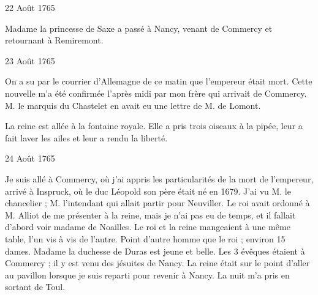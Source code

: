                      \begin{diary}{22 Août 1765}{}


                           Madame la princesse de Saxe a passé à
                           Nancy, venant de Commercy et retournant
                           à Remiremont. \bigskip


                     \end{diary}
                     \begin{diary}{23 Août 1765}{}

                         On a su par le courrier d'Allemagne de
                           ce matin que l'empereur était mort. Cette
                           nouvelle m'a été confirmée l'après midi
                           par mon frère qui
                           arrivait de Commercy.
                           M. le marquis du Chastelet en avait eu une
                           lettre de M. de Lomont. \bigskip



                           La reine est allée à
                              la fontaine royale. Elle
                           a pris trois oiseaux à la pipée, leur a fait
                           laver les ailes et leur a rendu la liberté. \bigskip


                     \end{diary}

                     \begin{diary}{24 Août 1765}{}

                         Je suis allé à Commercy, où j'ai appris les
                           particularités de la mort de l'empereur, arrivé
                           à Inspruck, où le duc Léopold son père était
                           né
                           en 1679. J'ai vu M. le chancelier ; M.
                              l'intendant qui allait partir pour Neuviller.
                           Le roi avait ordonné à
                              M. Alliot de me présenter
                           à la reine, mais je
                           n'ai pas eu de temps, et
                           il fallait d'abord voir madame de Noailles. Le roi et
                           la reine mangeaient à
                           une même table, l'un
                           vis à vis de l'autre. Point d'autre homme que
                           le roi ; environ 15 dames.
                              Madame la duchesse de
                              Duras est jeune et belle. Les 3 évêques étaient
                           à Commercy ; il y est venu
                           des jésuites de Nancy.
                           La reine était
                           sur le point d'aller au pavillon
                           lorsque je suis reparti pour revenir à Nancy.
                           La nuit m'a pris en sortant de Toul. \bigskip


                     \end{diary}


